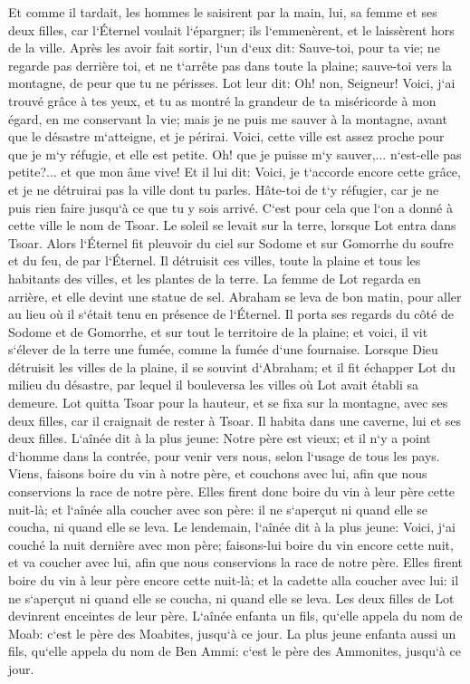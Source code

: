 \verse Et comme il tardait, les hommes le saisirent par la main, lui, sa femme et ses deux filles, car l`Éternel voulait l`épargner; ils l`emmenèrent, et le laissèrent hors de la ville. 
\verse Après les avoir fait sortir, l`un d`eux dit: Sauve-toi, pour ta vie; ne regarde pas derrière toi, et ne t`arrête pas dans toute la plaine; sauve-toi vers la montagne, de peur que tu ne périsses. 
\verse Lot leur dit: Oh! non, Seigneur! 
\verse Voici, j`ai trouvé grâce à tes yeux, et tu as montré la grandeur de ta miséricorde à mon égard, en me conservant la vie; mais je ne puis me sauver à la montagne, avant que le désastre m`atteigne, et je périrai. 
\verse Voici, cette ville est assez proche pour que je m`y réfugie, et elle est petite. Oh! que je puisse m`y sauver,... n`est-elle pas petite?... et que mon âme vive! 
\verse Et il lui dit: Voici, je t`accorde encore cette grâce, et je ne détruirai pas la ville dont tu parles. 
\verse Hâte-toi de t`y réfugier, car je ne puis rien faire jusqu`à ce que tu y sois arrivé. C`est pour cela que l`on a donné à cette ville le nom de Tsoar. 
\verse Le soleil se levait sur la terre, lorsque Lot entra dans Tsoar. 
\verse Alors l`Éternel fit pleuvoir du ciel sur Sodome et sur Gomorrhe du soufre et du feu, de par l`Éternel. 
\verse Il détruisit ces villes, toute la plaine et tous les habitants des villes, et les plantes de la terre. 
\verse La femme de Lot regarda en arrière, et elle devint une statue de sel. 
\verse Abraham se leva de bon matin, pour aller au lieu où il s`était tenu en présence de l`Éternel. 
\verse Il porta ses regards du côté de Sodome et de Gomorrhe, et sur tout le territoire de la plaine; et voici, il vit s`élever de la terre une fumée, comme la fumée d`une fournaise. 
\verse Lorsque Dieu détruisit les villes de la plaine, il se souvint d`Abraham; et il fit échapper Lot du milieu du désastre, par lequel il bouleversa les villes où Lot avait établi sa demeure. 
\verse Lot quitta Tsoar pour la hauteur, et se fixa sur la montagne, avec ses deux filles, car il craignait de rester à Tsoar. Il habita dans une caverne, lui et ses deux filles. 
\verse L`aînée dit à la plus jeune: Notre père est vieux; et il n`y a point d`homme dans la contrée, pour venir vers nous, selon l`usage de tous les pays. 
\verse Viens, faisons boire du vin à notre père, et couchons avec lui, afin que nous conservions la race de notre père. 
\verse Elles firent donc boire du vin à leur père cette nuit-là; et l`aînée alla coucher avec son père: il ne s`aperçut ni quand elle se coucha, ni quand elle se leva. 
\verse Le lendemain, l`aînée dit à la plus jeune: Voici, j`ai couché la nuit dernière avec mon père; faisons-lui boire du vin encore cette nuit, et va coucher avec lui, afin que nous conservions la race de notre père. 
\verse Elles firent boire du vin à leur père encore cette nuit-là; et la cadette alla coucher avec lui: il ne s`aperçut ni quand elle se coucha, ni quand elle se leva. 
\verse Les deux filles de Lot devinrent enceintes de leur père. 
\verse L`aînée enfanta un fils, qu`elle appela du nom de Moab: c`est le père des Moabites, jusqu`à ce jour. 
\verse La plus jeune enfanta aussi un fils, qu`elle appela du nom de Ben Ammi: c`est le père des Ammonites, jusqu`à ce jour. 

